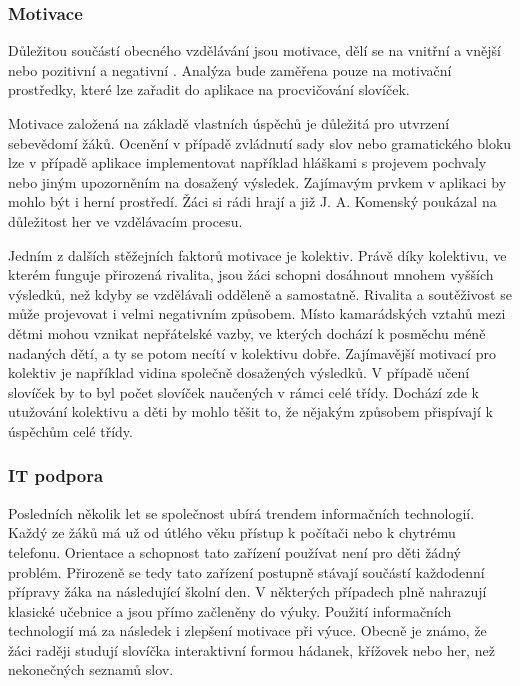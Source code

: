 \documentclass[a4paper,11pt,titlepage,fleqn]{article}
\begin{document}
        \subsubsection{Motivace}
            Důležitou součástí obecného vzdělávání jsou motivace, dělí se na vnitřní a vnější nebo pozitivní a negativní \cite{bib:motivace}. Analýza bude zaměřena pouze na motivační prostředky, které lze zařadit do aplikace na procvičování slovíček.

            Motivace založená na základě vlastních úspěchů je důležitá pro utvrzení sebevědomí žáků. Ocenění v případě zvládnutí sady slov nebo gramatického bloku lze v případě aplikace implementovat například hláškami s projevem pochvaly nebo jiným upozorněním na dosažený výsledek. Zajímavým prvkem v aplikaci by mohlo být i herní prostředí. Žáci si rádi hrají a již J. A. Komenský poukázal na důležitost her ve vzdělávacím procesu.


            Jedním z dalších stěžejních faktorů motivace je kolektiv. Právě díky kolektivu, ve kterém funguje přirozená rivalita, jsou žáci schopni dosáhnout mnohem vyšších výsledků, než kdyby se vzdělávali odděleně a samostatně. Rivalita a soutěživost se může projevovat i velmi negativním způsobem. Místo kamarádských vztahů mezi dětmi mohou vznikat nepřátelské vazby, ve kterých dochází k posměchu méně nadaných dětí, a ty se potom necítí v kolektivu dobře. Zajímavější motivací pro kolektiv je například vidina společně dosažených výsledků. V případě učení slovíček by to byl počet slovíček naučených v rámci celé třídy. Dochází zde k utužování kolektivu a děti by mohlo těšit to, že nějakým způsobem přispívají k úspěchům celé třídy.

        \subsubsection{IT podpora}
            Posledních několik let se společnost ubírá trendem informačních technologií. Každý ze žáků má už od útlého věku přístup k počítači nebo k chytrému telefonu. Orientace a schopnost tato zařízení používat není pro děti žádný problém. Přirozeně se tedy tato zařízení postupně stávají součástí každodenní přípravy žáka na následující školní den. V některých případech plně nahrazují klasické učebnice a jsou přímo začleněny do výuky. Použití informačních technologií má za následek i zlepšení motivace při výuce. Obecně je známo, že žáci raději studují slovíčka interaktivní formou hádanek, křížovek nebo her, než nekonečných seznamů slov.
\end{document}
